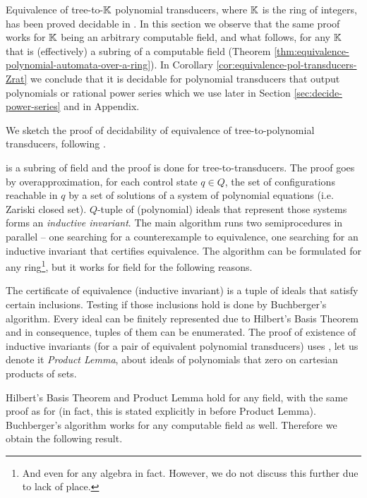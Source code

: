 Equivalence of tree-to-${\mathbb K}$ polynomial transducers, where ${\mathbb K}$ is the ring of integers, has been proved decidable in \cite{seidlManethKemper2018}.
In this section we observe that the same proof works for ${\mathbb K}$ being an arbitrary computable field, and what follows, for any ${\mathbb K}$ that is (effectively) a subring of a computable field (Theorem \ref{thm:equivalence-polynomial-automata-over-a-ring}). In Corollary \ref{cor:equivalence-pol-transducers-Zrat} we conclude that it is decidable for polynomial transducers that output polynomials or rational power series which we use later in Section \ref{sec:decide-power-series} and in Appendix.


We sketch the proof of decidability of equivalence of tree-to-\Z polynomial transducers, following \cite{seidlManethKemper2018}.

\Z is a subring of field \Q and the proof is done for tree-to-\Q transducers.
The proof goes by overapproximation, for each control state $q \in Q$, the set of configurations reachable in $q$ by a set of solutions of a system of polynomial equations (i.e. Zariski closed set).
$Q$-tuple of (polynomial) ideals that represent those systems forms an \emph{inductive invariant}.
The main algorithm runs two semiprocedures in parallel -- one searching for a counterexample to equivalence, one searching for an inductive invariant that certifies equivalence. The algorithm can be formulated for any ring\footnote{And even for any algebra in fact. However, we do not discuss this further due to lack of place.}, but it works for field \Q for the following reasons.

The certificate of equivalence (inductive invariant) is a tuple of ideals that satisfy certain inclusions. Testing if those inclusions hold is done by Buchberger's algorithm. Every ideal can be finitely represented due to Hilbert's Basis Theorem and in consequence, tuples of them can be enumerated.
The proof of existence of inductive invariants (for a pair of equivalent polynomial transducers) uses \cite[Lemma 6.3]{seidlManethKemper2018}, let us denote it \emph{Product Lemma}, about ideals of polynomials that zero on cartesian products of sets.

Hilbert's Basis Theorem and Product Lemma hold for any field, with the same proof as for \Q (in fact, this is stated explicitly in \cite{seidlManethKemper2018} before Product Lemma). Buchberger's algorithm works for any computable field as well.
Therefore we obtain the following result.



